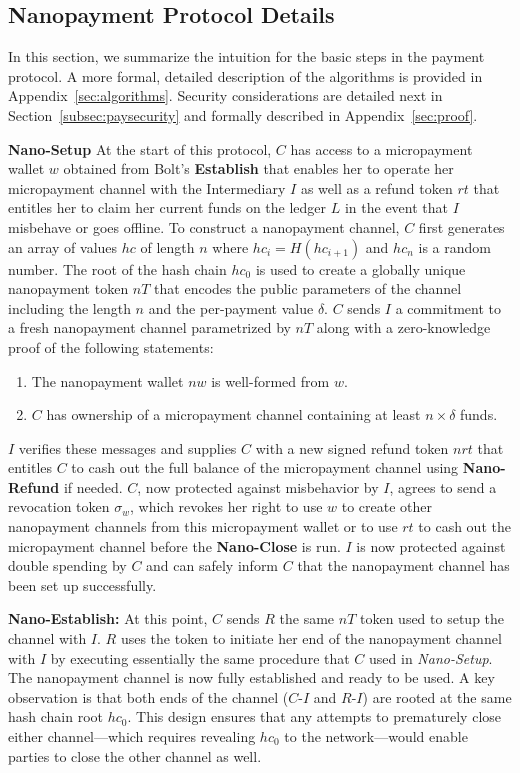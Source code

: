 \subsection{Nanopayment Protocol Details}

\label{sec:nanopaymentdetails} In this section, we summarize the intuition for the basic steps in the payment protocol.
A more formal, detailed description of the algorithms is provided in Appendix~\ref{sec:algorithms}.
Security considerations are detailed next in Section~\ref{subsec:paysecurity} and formally described in Appendix~\ref{sec:proof}.

\medskip \noindent\textbf{Nano-Setup} At the start of this protocol, $C$ has access to a micropayment wallet $w$ obtained from Bolt's \textbf{Establish} that enables her to operate her micropayment channel with the Intermediary $I$ as well as a refund token $rt$ that entitles her to claim her current funds on the ledger $L$ in the event that $I$ misbehave or goes offline.
To construct a nanopayment channel, $C$ first generates an array of values $hc$ of length $n$ where $hc_i = H(hc_{i+1})$ and $hc_n$ is a random number.
The root of the hash chain $hc_0$ is used to create a globally unique nanopayment token $nT$ that encodes the public parameters of the channel including the length $n$ and the per-payment value $\delta$.
$C$ sends $I$ a commitment to a fresh nanopayment channel parametrized by $nT$ along with a zero-knowledge proof of the following statements:

\begin{enumerate}
\item The nanopayment wallet $nw$ is well-formed from $w$.
\item $C$ has ownership of a micropayment channel containing at least $n \times \delta$ funds.
\end{enumerate}

$I$ verifies these messages and supplies $C$ with a new signed refund token $nrt$ that entitles $C$ to cash out the full balance of the micropayment channel using \textbf{Nano-Refund} if needed.
$C$, now protected against misbehavior by $I$, agrees to send a revocation token $\sigma_w$, which revokes her right to use $w$ to create other nanopayment channels from this micropayment wallet or to use $rt$ to cash out the micropayment channel before the \textbf{Nano-Close} is run.
$I$ is now protected against double spending by $C$ and can safely inform $C$ that the nanopayment channel has been set up successfully.

\medskip \noindent\textbf{Nano-Establish:} At this point, $C$ sends $R$ the same $nT$ token used to setup the channel with $I$.
$R$ uses the token to initiate her end of the nanopayment channel with $I$ by executing essentially the same procedure that $C$ used in \emph{Nano-Setup}.
The nanopayment channel is now fully established and ready to be used.
A key observation is that both ends of the channel ($C$-$I$ and $R$-$I$) are rooted at the same hash chain root $hc_0$.
This design ensures that any attempts to prematurely close either channel---which requires revealing $hc_0$ to the network---would enable parties to close the other channel as well.


